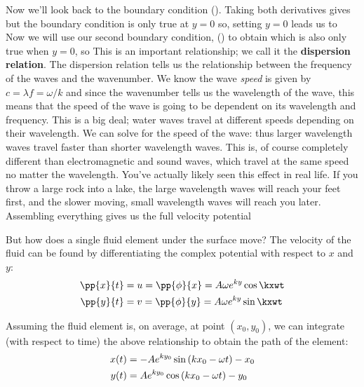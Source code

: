 \documentclass[12pt]{book}
\begin{document}
Now we'll look back to the boundary condition ().  Taking both derivatives  gives
 but the boundary condition is only true at $y=0$ so, setting $y=0$ leads us to
Now we will use our second boundary condition, () to obtain
which is also only true when $y=0$, so
This is an important relationship; we call it the \textbf{dispersion relation}.  The dispersion relation tells us the relationship between the frequency of the waves and the wavenumber.  We know the wave \textit{speed} is given by $c=\lambda f = \omega / k$ and since the wavenumber tells us the wavelength of the wave, this means that the speed of the wave is going to be dependent on its wavelength and frequency.  This is a big deal; water waves travel at different speeds depending on their wavelength. We can solve for the speed of the wave:
 thus larger wavelength waves travel faster than shorter wavelength waves. This is, of course completely different than electromagnetic and sound waves, which travel at the same speed no matter the wavelength.  You've actually likely seen this effect in real life.  If you throw a large rock into a lake, the large wavelength waves will reach your feet first, and the slower moving, small wavelength waves will reach you later.\\



Assembling everything gives us the full velocity potential

But how does a single fluid element under the surface move?  The velocity of the fluid can be found by differentiating the complex potential with respect to $x$ and $y$:
\begin{align*}
\pp{x}{t} &= u = \pp{\phi}{x} = A\omega\e{ky}\cos\kxwt \\ 
\pp{y}{t} &= v = \pp{\phi}{y} = A\omega\e{ky}\sin\kxwt
\end{align*}

Assuming the fluid element is, on average, at point $(x_0, y_0)$, we can integrate (with respect to time) the above relationship to obtain the path of the element:
\begin{align*}
x(t) & = -Ae^{ky_0}\sin\left(kx_0 - \omega t\right) - x_0 \\
y(t) & = Ae^{ky_0}\cos\left(kx_0 - \omega t\right) - y_0 \\
\end{align*}
\end{document}
